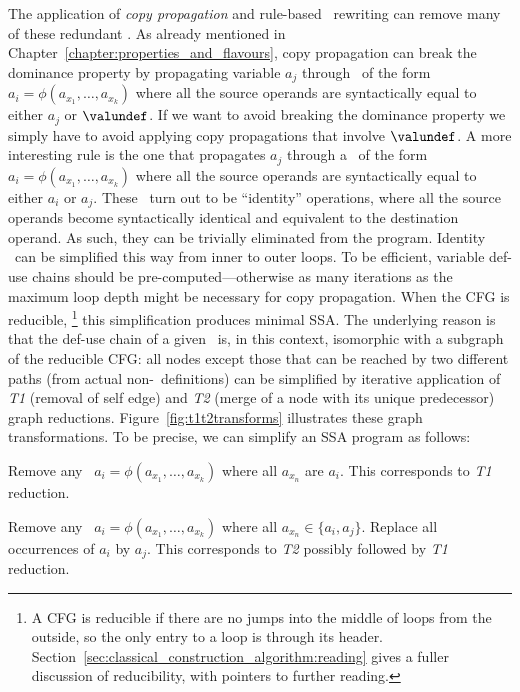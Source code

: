 {The application of \emph{copy propagation} and rule-based \phifun\ rewriting
can remove many of these redundant \phifuns. 
As already mentioned in Chapter~\ref{chapter:properties_and_flavours}, 
copy propagation can break the dominance property by propagating 
variable $a_j$ through \phifuns\ of the form $a_i=\phi(a_{x_1},\ldots,a_{x_k})$ where
all the source operands are syntactically equal to either $a_j$ or $\valundef$. 
If we want to avoid breaking the dominance property we simply have to
avoid applying copy propagations that involve $\valundef$. 
A more interesting rule is the one that propagates $a_j$ through a
\phifun\ of the form $a_i=\phi(a_{x_1},\ldots,a_{x_k})$ where all the source operands are
syntactically equal to either $a_i$ or $a_j$. 
These \phifuns\ turn out to be ``identity'' operations, where all the
source operands become syntactically identical and equivalent to the 
destination operand. As such, they can be trivially eliminated from the program.
Identity \phifuns\ can be simplified this way from inner to outer loops. 
To be efficient, 
variable def-use chains should be pre-computed---otherwise as many iterations 
as the maximum loop depth might be necessary for copy propagation.
When the CFG is reducible,%
\footnote{A CFG is reducible if there are no jumps into the middle of loops
from the outside, so the only entry to a loop is through its header.
Section~\ref{sec:classical_construction_algorithm:reading} 
gives a fuller discussion of reducibility, with
pointers to further reading.}
this simplification produces minimal SSA. 
The underlying reason is that the def-use chain of a given \phiweb\ is,
in this context, isomorphic with a subgraph of the reducible CFG: 
all nodes except those that can be reached by two different paths (from
actual non-\phifun\ definitions) can be simplified by iterative 
application of 
\emph{T1} (removal of self edge) and 
\emph{T2} (merge of a node with its unique predecessor) graph reductions.
Figure~\ref{fig:t1t2transforms} illustrates these graph transformations.
To be precise, we can simplify an SSA program as follows:
\begin{compactenum}
\item Remove any \phifun\ $a_i=\phi(a_{x_1},\ldots,a_{x_k})$ where all $a_{x_n}$
  are $a_i$. This corresponds to \emph{T1} reduction.
\item Remove any \phifun\ $a_i=\phi(a_{x_1},\ldots,a_{x_k})$ where all
  $a_{x_n} \in \{ a_i, a_j \}$. Replace all occurrences of $a_i$ by $a_j$.
 This corresponds to \emph{T2} possibly followed by
 \emph{T1} reduction.
\end{compactenum}

}
